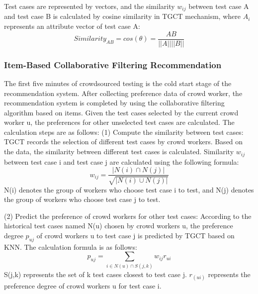 Test cases are represented by vectors, and the similarity $w_{ij}$ between test case A and test case B is calculated by cosine similarity in TGCT mechanism, where $A_{i}$ represents an attribute vector of test case A:
\begin{equation}
Similarity_{AB} = cos(\theta) = \frac{AB}{||A||||B||}
\end{equation}

\subsubsection{Item-Based Collaborative Filtering Recommendation}
The first five minutes of crowdsourced testing is the cold start stage of the recommendation system. After collecting preference data of crowd worker, the recommendation system is completed by using the collaborative filtering algorithm based on items. Given the test cases selected by the current crowd worker u, the preferences for other unselected test cases are calculated. The calculation steps are as follows: (1) Compute the similarity between test cases: TGCT records the selection of different test cases by crowd workers. Based on the data, the similarity between different test cases is calculated. Similarity $w_{ij}$ between test case i and test case j are calculated using the following formula:
\begin{equation}
w_{ij} = \frac{|N(i) \cap N(j)|}{\sqrt{|N(i) \cup N(j)|}}
\end{equation}
N(i) denotes the group of workers who choose test case i to test, and N(j) denotes the group of workers who choose test case j to test.

(2) Predict the preference of crowd workers for other test cases: According to the historical test cases named N(u) chosen by crowd workers u, the preference degree $p_{uj}$ of crowd workers u to test case j is predicted by TGCT based on KNN. The calculation formula is as follows:
\begin{equation}
p_{uj} = \sum_{i\in N(u) \cap S(j,k)}w_{ij}r_{ui}
\end{equation}
S(j,k) represents the set of k test cases closest to test case j. $r_(ui)$ represents the preference degree of crowd workers u for test case i. 

